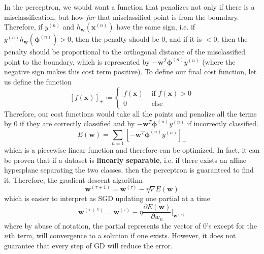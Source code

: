 \documentclass{article}
\theoremstyle{definition}
\begin{document}
  In the perceptron, we would want a function that penalizes not only if there is a misclassification, but how \textit{far} that misclassified point is from the boundary. Therefore, if $y^{(n)}$ and $h_\mathbf{w} (\mathbf{x}^{(n)})$ have the same sign, i.e. if $y^{(n)} h_\mathbf{w} (\boldsymbol{\phi}^{(n)}) > 0$, then the penalty should be $0$, and if it is $< 0$, then the penalty should be proportional to the orthogonal distance of the misclassified point to the boundary, which is represented by $-\mathbf{w}^T \boldsymbol{\phi}^{(n)} y^{(n)}$ (where the negative sign makes this cost term positive). To define our final cost function, let us define the function 
  \[[f(\mathbf{x})]_+ \coloneqq \begin{cases} f(\mathbf{x}) & \text{ if } f(\mathbf{x}) > 0 \\ 0 & \text{ else } \end{cases}\]
  Therefore, our cost functions would take all the points and penalize all the terms by $0$ if they are correctly classified and by $-\mathbf{w}^T \boldsymbol{\phi}^{(n)} y^{(n)}$ if incorrectly classified. 
  \[E(\mathbf{w}) = \sum_{n=1} [ -\mathbf{w}^T \boldsymbol{\phi}^{(n)} y^{(n)} ]_+\]
  which is a piecewise linear function and therefore can be optimized. In fact, it can be proven that if a dataset is \textbf{linearly separable}, i.e. if there exists an affine hyperplane separating the two classes, then the perceptron is guaranteed to find it. Therefore, the gradient descent algorithm
  \[\mathbf{w}^{(\tau + 1)} = \mathbf{w}^{(\tau)} - \eta \nabla E(\mathbf{w})\]
  which is easier to interpret as SGD updating one partial at a time
  \[\mathbf{w}^{(\tau + 1)} = \mathbf{w}^{(\tau)} - \eta \frac{\partial E(\mathbf{w})}{\partial w_n} \bigg|_{\mathbf{w}^{(\tau)}}\]
  where by abuse of notation, the partial represents the vector of $0$'s except for the $n$th term, will convergence to a solution if one exists. However, it does not guarantee that every step of GD will reduce the error. 
\end{document}
